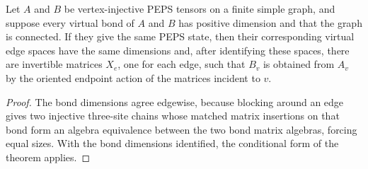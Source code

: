 \begin{theorem}%
    \label{thm:fundamentalTheorem_PEPS}
    \leanok
    Let $A$ and $B$ be vertex-injective PEPS tensors on a finite simple
    graph, and suppose every virtual bond of $A$ and $B$ has positive
    dimension and that the graph is connected. If they give the same PEPS
    state, then their corresponding
    virtual edge spaces have the same dimensions and, after identifying these
    spaces, there are invertible matrices $X_e$, one for each edge, such that
    $B_v$ is obtained from $A_v$ by the oriented endpoint action of the matrices
    incident to $v$.
\end{theorem}
\begin{proof}\leanok
    The bond dimensions agree edgewise, because blocking around an edge gives
    two injective three-site chains whose matched matrix insertions on that bond
    form an algebra equivalence between the two bond matrix algebras, forcing
    equal sizes. With the bond dimensions identified, the conditional form of
    the theorem applies.
\end{proof}
